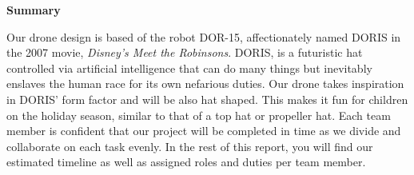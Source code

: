 \begin{center}
\textbf{Summary}
\end{center}
Our drone design is based of the robot DOR-15, affectionately named DORIS in the 2007 movie, \textit{Disney's Meet the Robinsons}. DORIS, is a futuristic hat controlled via artificial intelligence that can do many things but inevitably enslaves the human race for its own nefarious duties. Our drone takes inspiration in DORIS' form factor and will be also hat shaped. This makes it fun for children on the holiday season, similar to that of a top hat or propeller hat. Each team member is confident that our project will be completed in time as we divide and collaborate on each task evenly. In the rest of this report, you will find our estimated timeline as well as assigned roles and duties per team member.\par